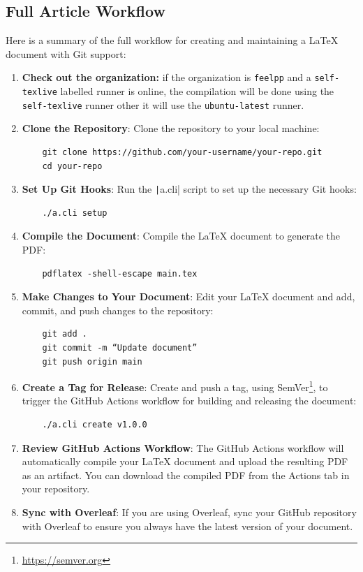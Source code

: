 \documentclass[a4paper]{article}
\begin{document}
\subsection{Full Article Workflow}
\label{sec:full-article-workflow}


Here is a summary of the full workflow for creating and maintaining a \LaTeX{} document with Git support:

\begin{enumerate}
    \item \textbf{Check out the organization:} if the organization is \texttt{feelpp} and a \texttt{self-texlive} labelled runner is online, the compilation will be done using the \texttt{self-texlive} runner other it will use the \texttt{ubuntu-latest} runner.
    \item \textbf{Clone the Repository}:
    Clone the repository to your local machine:
    \begin{verbatim}
    git clone https://github.com/your-username/your-repo.git
    cd your-repo
    \end{verbatim}
    \item \textbf{Set Up Git Hooks}:
    Run the \texttt|a.cli| script to set up the necessary Git hooks:
    \begin{verbatim}
    ./a.cli setup
    \end{verbatim}
    \item  \textbf{Compile the Document}:
    Compile the \LaTeX{} document to generate the PDF:
    \begin{verbatim}
    pdflatex -shell-escape main.tex
    \end{verbatim}
    \item \textbf{Make Changes to Your Document}:
    Edit your \LaTeX{} document and add, commit, and push changes to the repository:
    \begin{verbatim}
    git add .
    git commit -m “Update document”
    git push origin main
    \end{verbatim}
    \item \textbf{Create a Tag for Release}:
    Create and push a tag, using SemVer\footnote{\url{https://semver.org}},  to trigger the GitHub Actions workflow for building and releasing the document:
    \begin{verbatim}
    ./a.cli create v1.0.0
    \end{verbatim}
    \item \textbf{Review GitHub Actions Workflow}:
    The GitHub Actions workflow will automatically compile your \LaTeX{} document and upload the resulting PDF as an artifact.
    You can download the compiled PDF from the Actions tab in your repository.
    \item \textbf{Sync with Overleaf}:
    If you are using Overleaf, sync your GitHub repository with Overleaf to ensure you always have the latest version of your document.
\end{enumerate}
\end{document}
